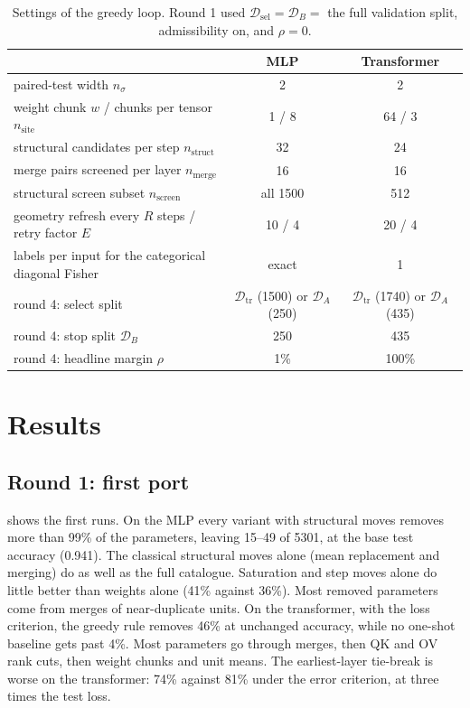 \documentclass[11pt,a4paper]{article}
\theoremstyle{definition}
\newcommand{\D}{\mathcal{D}}
\newcommand{\Dtr}{\D_{\mathrm{tr}}}
\newcommand{\Dsel}{\D_{\mathrm{sel}}}
\newcommand{\DA}{\D_{A}}
\newcommand{\DB}{\D_{B}}
\begin{document}
\begin{table}[t]
\centering\small
\caption{Settings of the greedy loop. Round 1 used $\Dsel=\DB=$ the full validation split,
admissibility on, and $\rho=0$.}
\label{tab:hyper}
\begin{tabular}{@{}lcc@{}}
\toprule
& MLP & Transformer\\
\midrule
paired-test width $n_\sigma$ & 2 & 2\\
weight chunk $w$ / chunks per tensor $n_{\mathrm{site}}$ & 1 / 8 & 64 / 3\\
structural candidates per step $n_{\mathrm{struct}}$ & 32 & 24\\
merge pairs screened per layer $n_{\mathrm{merge}}$ & 16 & 16\\
structural screen subset $n_{\mathrm{screen}}$ & all 1500 & 512\\
geometry refresh every $R$ steps / retry factor $E$ & 10 / 4 & 20 / 4\\
labels per input for the categorical diagonal Fisher & exact & 1\\
round 4: select split & $\Dtr$ (1500) or $\DA$ (250) & $\Dtr$ (1740) or $\DA$ (435)\\
round 4: stop split $\DB$ & 250 & 435\\
round 4: headline margin $\rho$ & 1\% & 100\%\\
\bottomrule
\end{tabular}
\end{table}

\section{Results}
\label{sec:results}

\subsection{Round 1: first port}
\label{sec:res-round1}

 shows the first runs. On the MLP every variant with structural moves
removes more than 99\% of the parameters, leaving 15--49 of 5301, at the base test
accuracy (0.941). The classical structural moves alone (mean replacement and merging)
do as well as the full catalogue. Saturation and step moves alone do little better than
weights alone (41\% against 36\%). Most removed parameters come from merges of
near-duplicate units. On the transformer, with the loss
criterion, the greedy rule removes 46\% at unchanged accuracy, while no one-shot
baseline gets past 4\%. Most parameters go through merges, then QK and OV rank cuts, then
weight chunks and unit means. The earliest-layer tie-break is worse on the transformer:
74\% against 81\% under the error criterion, at three times the test loss.
\end{document}
